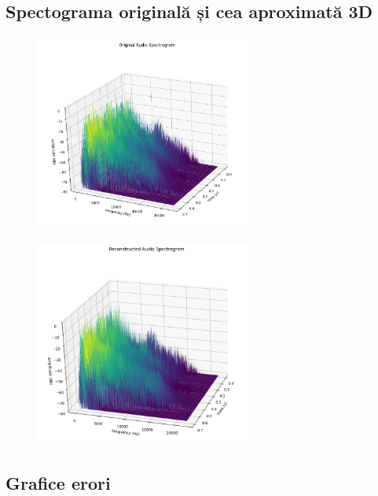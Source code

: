 \documentclass[12pt]{article}
\begin{document}
\subsection{Spectograma originală și cea aproximată 3D}

\begin{figure}[h!]
    \centering
    \includegraphics[width=0.65\textwidth]{3dog.png}
\end{figure}

\begin{figure}[h!]
    \centering
    \includegraphics[width=0.65\textwidth]{3dap.png}
\end{figure}

\subsection{Grafice erori}
\end{document}

